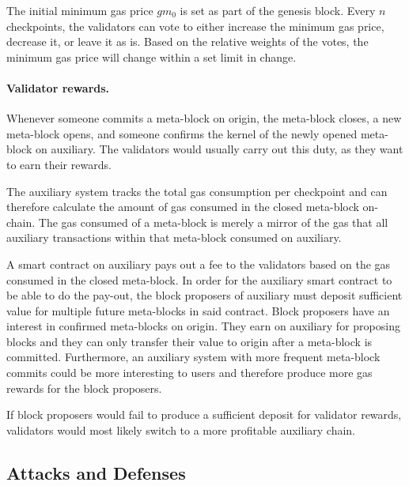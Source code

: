 \documentclass[12pt,a4paper]{article}
\begin{document}
The initial minimum gas price $gm_0$ is set as part of the genesis block.
Every $n$ checkpoints, the validators can vote to either increase the minimum gas price, decrease it, or leave it as is.
Based on the relative weights of the votes, the minimum gas price will change within a set limit in change.

\paragraph{Validator rewards.}
Whenever someone commits a meta-block on origin, the meta-block closes, a new meta-block opens, and someone confirms the kernel of the newly opened meta-block on auxiliary.
The validators would usually carry out this duty, as they want to earn their rewards.

The auxiliary system tracks the total gas consumption per checkpoint and can therefore calculate the amount of gas consumed in the closed meta-block on-chain.
The gas consumed of a meta-block is merely a mirror of the gas that all auxiliary transactions within that meta-block consumed on auxiliary.

A smart contract on auxiliary pays out a fee to the validators based on the gas consumed in the closed meta-block.
In order for the auxiliary smart contract to be able to do the pay-out, the block proposers of auxiliary must deposit sufficient value for multiple future meta-blocks in said contract.
Block proposers have an interest in confirmed meta-blocks on origin.
They earn on auxiliary for proposing blocks and they can only transfer their value to origin after a meta-block is committed.
Furthermore, an auxiliary system with more frequent meta-block commits could be more interesting to users and therefore produce more gas rewards for the block proposers.

If block proposers would fail to produce a sufficient deposit for validator rewards, validators would most likely switch to a more profitable auxiliary chain.

\subsection{Attacks and Defenses}
\end{document}
